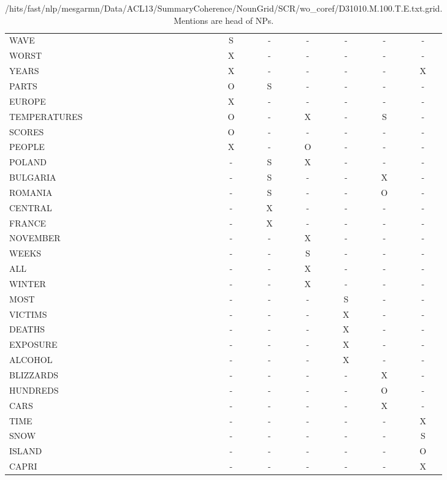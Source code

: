 \begin{table}
\centering
\begin{tabular}{lcccccc}
\hline
WAVE & S & - & - & - & - & - \\
WORST & X & - & - & - & -  &- \\
YEARS  &X  & -  &-  &-  &-  &X \\
PARTS  &O & S  &-  &-  &-  &-  \\
EUROPE  &X & - & - & - & - & - \\
TEMPERATURES  &O  &-  &X  &-  &S  &-  \\
SCORES  &O  &-  &-  &-  &-  &-  \\
PEOPLE  &X  &- & O  &-  &-  &-  \\
POLAND  &-  &S & X  &-  & -  &-  \\
BULGARIA  &-  &S  &-  &-  &X  &-  \\
ROMANIA  &-  &S  &-  &-  &O  &-  \\
CENTRAL  &-  &X  &- & - & - & -  \\
FRANCE  &-  &X  &-  &- & - & -  \\
NOVEMBER  &-  &- & X  &-  &-  &-  \\
WEEKS  &-  &-  &S  &-  &-  &-  \\
ALL  &-  &-  &X  &-  &-  &-  \\
WINTER  &-  & -  &X  &-  &-  &-  \\
MOST  &-  &-  &-  &S  &- & -  \\
VICTIMS  &-  &-  &-  &X  &-  &-  \\
DEATHS  &-  &-  &- & X  &-  &-  \\
EXPOSURE  &- & - & -  &X  &-  &-  \\
ALCOHOL  &-  &-  &-  &X  &-  &-  \\
BLIZZARDS  &-  &-  &-  &-  &X  &-  \\
HUNDREDS  &-  &-  &-  &-  &O  & -  \\
CARS  &-  &-  &-  &-  &X  &-  \\
TIME  &-  &-  &-  &-  &-  &X  \\
SNOW  &-  &- & - & - & - & S  \\
ISLAND & - & - & - & - & - & O  \\
CAPRI & - & - & - & - & - & X  \\
\hline
\end{tabular}
\caption{/hits/fast/nlp/mesgarmn/Data/ACL13/SummaryCoherence/NounGrid/SCR/wo\_coref/D31010.M.100.T.E.txt.grid. Mentions are head of NPs.}
\end{table}



